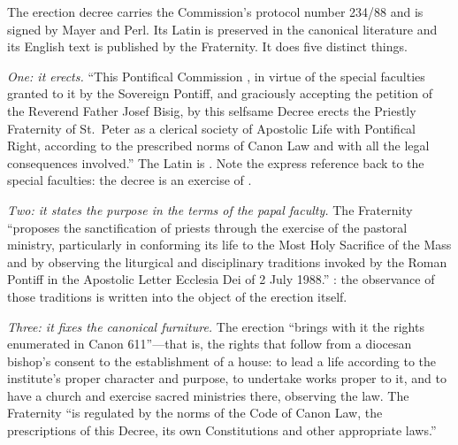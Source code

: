 The erection decree carries the Commission's protocol number 234/88 and
is signed by Mayer and Perl. Its Latin is preserved in the canonical
literature and its English text is published by the Fraternity. It does
five distinct things.

\emph{One: it erects.} ``This Pontifical Commission ,
in virtue of the special faculties granted to it by the Sovereign
Pontiff, and graciously accepting the petition of the Reverend Father
Josef Bisig, by this selfsame Decree erects the Priestly Fraternity of
St.\ Peter as a clerical society of Apostolic Life with Pontifical Right,
according to the prescribed norms of Canon Law and with all the legal
consequences involved.'' The Latin is . Note the express reference back to the special
faculties: the decree is an exercise of .

\emph{Two: it states the purpose in the terms of the papal faculty.} The
Fraternity ``proposes the sanctification of priests through the exercise
of the pastoral ministry, particularly in conforming its life to the Most
Holy Sacrifice of the Mass and by observing the liturgical and
disciplinary traditions invoked by the Roman Pontiff in the Apostolic
Letter Ecclesia Dei of 2 July 1988.'' : the
observance of those traditions is written into the object of the erection
itself.

\emph{Three: it fixes the canonical furniture.} The erection ``brings
with it the rights enumerated in Canon 611''---that is, the rights that
follow from a diocesan bishop's consent to the establishment of a house:
to lead a life according to the institute's proper character and purpose,
to undertake works proper to it, and to have a church and exercise sacred
ministries there, observing the law. The Fraternity ``is regulated by the
norms of the Code of Canon Law, the prescriptions of this Decree, its own
Constitutions and other appropriate laws.''

